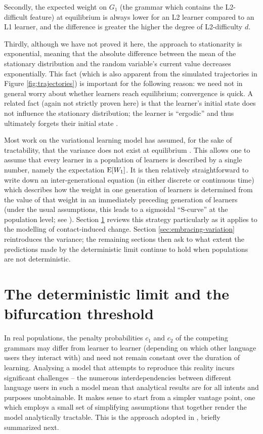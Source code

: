 Secondly, the expected weight on \(G_1\) (the grammar which contains the
L2-difficult feature) at equilibrium is always lower for an L2 learner
compared to an L1 learner, and the difference is greater the higher the
degree of L2-difficulty \(d\).

Thirdly, although we have not proved it here, the approach to
stationarity is exponential, meaning that the absolute difference
between the mean of the stationary distribution and the random
variable's current value decreases exponentially. This fact (which is
also apparent from the simulated trajectories in Figure
\ref{fig:trajectories}) is important for the following reason: we need
not in general worry about whether learners reach equilibrium;
convergence is quick. A related fact (again not strictly proven here) is
that the learner's initial state does not influence the stationary
distribution; the learner is ``ergodic'' and thus ultimately forgets
their initial state \autocite{NarendraThathachar1989}.

Most work on the variational learning model has assumed, for the sake of
tractability, that the variance does not exist at equilibrium
\autocites[e.g.][]{Yang2000,HeyWal2013,SimEtAl2019,Kauhanen2022}. This
allows one to assume that every learner in a population of learners is
described by a single number, namely the expectation
\(\textnormal{E}[W_1]\). It is then relatively straightforward to write
down an inter-generational equation (in either discrete or continuous
time) which describes how the weight in one generation of learners is
determined from the value of that weight in an immediately preceding
generation of learners (under the usual assumptions, this leads to a
sigmoidal ``S-curve'' at the population level; see
\cite{WallenbergEtAlDiaCom}). Section \ref{sec:bifurcation-threshold}
reviews this strategy particularly as it applies to the modelling of
contact-induced change. Section \ref{sec:embracing-variation}
reintroduces the variance; the remaining sections then ask to what
extent the predictions made by the deterministic limit continue to hold
when populations are not deterministic.

\hypertarget{sec:bifurcation-threshold}{%
\section{The deterministic limit and the bifurcation
threshold}\label{sec:bifurcation-threshold}}

In real populations, the penalty probabilities \(c_1\) and \(c_2\) of
the competing grammars may differ from learner to learner (depending on
which other language users they interact with) and need not remain
constant over the duration of learning. Analysing a model that attempts
to reproduce this reality incurs significant challenges -- the numerous
interdependencies between different language users in such a model mean
that analytical results are for all intents and purposes unobtainable.
It makes sense to start from a simpler vantage point, one which employs
a small set of simplifying assumptions that together render the model
analytically tractable. This is the approach adopted in
\textcite{Kauhanen2022}, briefly summarized next.


